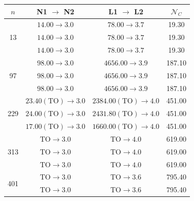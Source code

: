\FloatBarrier{}

\begin{table}[h!]
    \centering
    \begin{tabular}{c|c|c|c}
        \toprule
        $n$ & N1 $\rightarrow$ N2 & L1 $\rightarrow$ L2 & $\mathcal{N}_C$ \\
        \midrule

        \multirow{3}{*}{13}
            & $14.00 \rightarrow 3.0$ & $78.00 \rightarrow 3.7$ & 19.30 \\
            & $14.00 \rightarrow 3.0$ & $78.00 \rightarrow 3.7$ & 19.30 \\
            & $14.00 \rightarrow 3.0$ & $78.00 \rightarrow 3.7$ & 19.30 \\

        \cmidrule(lr){1-4}

        \multirow{3}{*}{97}
            & $98.00 \rightarrow 3.0$ & $4656.00 \rightarrow 3.9$ & 187.10 \\
            & $98.00 \rightarrow 3.0$ & $4656.00 \rightarrow 3.9$ & 187.10 \\
            & $98.00 \rightarrow 3.0$ & $4656.00 \rightarrow 3.9$ & 187.10 \\

        \cmidrule(lr){1-4}

        \multirow{3}{*}{229}
            & $23.40(\mathrm{TO}) \rightarrow 3.0$ & $2384.00(\mathrm{TO}) \rightarrow 4.0$ & 451.00 \\
            & $24.00(\mathrm{TO}) \rightarrow 3.0$ & $2431.80(\mathrm{TO}) \rightarrow 4.0$ & 451.00 \\
            & $17.00(\mathrm{TO}) \rightarrow 3.0$ & $1660.00(\mathrm{TO}) \rightarrow 4.0$ & 451.00 \\

        \cmidrule(lr){1-4}

        \multirow{3}{*}{313}
            & $\mathrm{TO} \rightarrow 3.0$ & $\mathrm{TO} \rightarrow 4.0$ & 619.00 \\
            & $\mathrm{TO} \rightarrow 3.0$ & $\mathrm{TO} \rightarrow 4.0$ & 619.00 \\
            & $\mathrm{TO} \rightarrow 3.0$ & $\mathrm{TO} \rightarrow 4.0$ & 619.00 \\

        \cmidrule(lr){1-4}

        \multirow{2}{*}{401}
            & $\mathrm{TO} \rightarrow 3.0$ & $\mathrm{TO} \rightarrow 3.6$ & 795.40 \\
            & $\mathrm{TO} \rightarrow 3.0$ & $\mathrm{TO} \rightarrow 3.6$ & 795.40 \\


\end{tabular}
\end{table}
